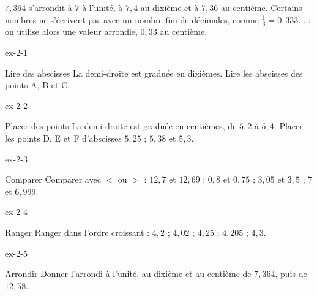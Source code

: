 \begin{exemple}$7{,}364$ s’arrondit à 7 à l’unité, à $7{,}4$ au dixième et à $7{,}36$ au centième. Certains nombres ne s’écrivent pas avec un nombre fini de décimales, comme $\frac13=0{,}333\ldots$ : on utilise alors une valeur arrondie, $0{,}33$ au centième.\end{exemple}

\clearpage{}
\begin{blocLivre}{ex-2-1}\begin{exercice}[1]{Lire des abscisses}
La demi-droite est graduée en dixièmes. Lire les abscisses des points A, B et C.
\label{fig-ex-2-1}
\end{exercice}\end{blocLivre}
\begin{blocLivre}{ex-2-2}\begin{exercice}[1]{Placer des points}
La demi-droite est graduée en centièmes, de $5{,}2$ à $5{,}4$. Placer les points D, E et F d’abscisses $5{,}25$ ; $5{,}38$ et $5{,}3$.
\label{fig-ex-2-2}
\end{exercice}\end{blocLivre}
\begin{blocLivre}{ex-2-3}\begin{exercice}[1]{Comparer}
Comparer avec $<$ ou $>$ : $12{,}7$ et $12{,}69$ ; $0{,}8$ et $0{,}75$ ; $3{,}05$ et $3{,}5$ ; $7$ et $6{,}999$.
\end{exercice}\end{blocLivre}
\begin{blocLivre}{ex-2-4}\begin{exercice}[1]{Ranger}
Ranger dans l’ordre croissant : $4{,}2$ ; $4{,}02$ ; $4{,}25$ ; $4{,}205$ ; $4{,}3$.
\end{exercice}\end{blocLivre}
\begin{blocLivre}{ex-2-5}\begin{exercice}[1]{Arrondir}
Donner l’arrondi à l’unité, au dixième et au centième de $7{,}364$, puis de $12{,}58$.
\end{exercice}\end{blocLivre}

